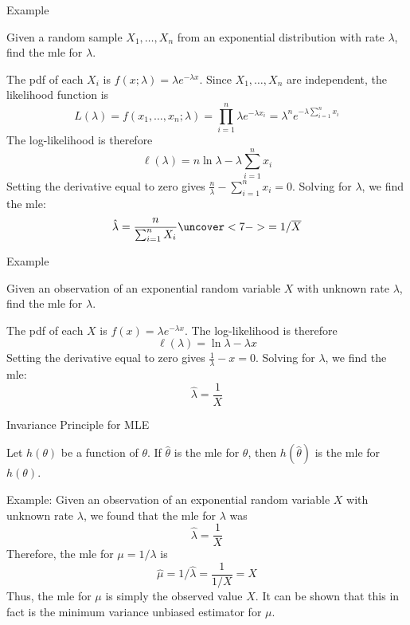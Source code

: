\documentclass[handout]{beamer}
\begin{document}
\begin{frame}{Example}
\begin{block}{}
Given a random sample $X_1,\dots,X_n$ from an exponential distribution with rate $\lambda$, find the mle for $\lambda$.
\end{block}
\pause
The pdf of each $X_i$ is $f(x;\lambda)=\lambda e^{-\lambda x}$. 
\pause Since $X_1,\dots,X_n$ are independent, the likelihood function is
$$L(\lambda)=f(x_1,\dots,x_n;\lambda) = \prod_{i=1}^n \lambda e^{-\lambda x_i} = \lambda^n e^{-\lambda\sum_{i=1}^n x_i}$$
\pause The log-likelihood is therefore
$$\ell(\lambda) = n\ln\lambda-\lambda\sum_{i=1}^n x_i$$
\pause Setting the derivative equal to zero gives $\frac n\lambda-\sum_{i=1}^n x_i=0$. \pause Solving for $\lambda$, we find the mle: $$\hat\lambda = \frac n{\sum_{i=1}^n X_i} 
\uncover<7->{= 1/\overline{X}}$$
\end{frame}

\begin{frame}{Example}
\begin{block}{}
Given an observation of an exponential random variable $X$ with unknown rate $\lambda$, find the mle for $\lambda$.
\end{block}
\pause
The pdf of each $X$ is $f(x)=\lambda e^{-\lambda x}$. 
\pause The log-likelihood is therefore
$$\ell(\lambda) = \ln\lambda-\lambda x$$
\pause Setting the derivative equal to zero gives $\frac 1\lambda-x=0$. \pause Solving for $\lambda$, we find the mle: $$\hat\lambda = \frac 1X$$
\end{frame}

\begin{frame}{Invariance Principle for MLE}
\begin{block}{}
Let $h(\theta)$ be a function of $\theta$. If $\hat\theta$ is the mle for $\theta$, then $h(\hat\theta)$ is the mle for $h(\theta)$.
\end{block}
%
\pause Example: Given an observation of an exponential random variable $X$ with unknown rate $\lambda$, we found that the mle for $\lambda$ was $$\hat\lambda = \frac1X$$
Therefore, the mle for $\mu=1/\lambda$ is $$\hat\mu = 1/\hat\lambda = \frac1{1/X}=X$$
Thus, the mle for $\mu$ is simply the observed value $X$. It can be shown that this in fact is the minimum variance unbiased estimator for $\mu$.
\end{frame}
\end{document}
